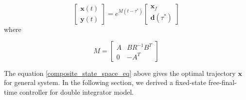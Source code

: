 \documentclass{article}%
\begin{document}
            \begin{equation} \label{composite_state_space_eq}
            \begin{bmatrix}
            \boldsymbol{x}(t)\\
            \boldsymbol{y}(t)
            \end{bmatrix}
            =
            e^{M(t-\tau^{*})}
            \begin{bmatrix}
            \boldsymbol{x}_f \\
            \boldsymbol{d}(\tau^{*})
            \end{bmatrix}
            \end{equation}
            where

            \begin{equation} \label{m_sym_eq}
            M = \begin{bmatrix}
            A & BR^{-1}B^{T}\\
            0 & -A^{T}
            \end{bmatrix}
            \end{equation}

            The equation \ref{composite_state_space_eq} above gives the optimal trajectory $\boldsymbol{x}$ for general system. In the following section, we derived a fixed-state free-final-time controller for double integrator model.
            

%
\end{document}
